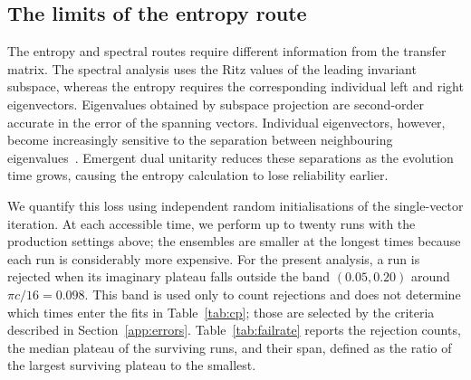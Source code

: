 \subsection{The limits of the entropy route}
\label{app:conditioning}
\label{app:failures}
The entropy and spectral routes require different information from the transfer matrix. The spectral analysis uses the Ritz values of the leading invariant subspace, whereas the entropy requires the corresponding individual left and right eigenvectors. Eigenvalues obtained by subspace projection are second-order accurate in the error of the spanning vectors. Individual eigenvectors, however, become increasingly sensitive to the separation between neighbouring eigenvalues~\cite{wilkinson1965}. Emergent dual unitarity reduces these separations as the evolution time grows, causing the entropy calculation to lose reliability earlier.

We quantify this loss using independent random initialisations of the single-vector iteration. At each accessible time, we perform up to twenty runs with the production settings above; the ensembles are smaller at the longest times because each run is considerably more expensive. For the present analysis, a run is rejected when its imaginary plateau falls outside the band $(0.05,0.20)$ around $\pi c/16=0.098$. This band is used only to count rejections and does not determine which times enter the fits in Table~\ref{tab:cp}; those are selected by the criteria described in Section~\ref{app:errors}. Table~\ref{tab:failrate} reports the rejection counts, the median plateau of the surviving runs, and their span, defined as the ratio of the largest surviving plateau to the smallest.

